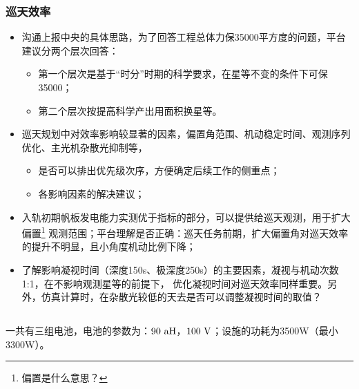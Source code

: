 \subsubsection{巡天效率}
\begin{itemize}
\item[1] 沟通上报中央的具体思路，为了回答工程总体力保35000平方度的问题，平台建议分两个层次回答：
    \begin{itemize}
	\item 第一个层次是基于“时分”时期的科学要求，在星等不变的条件下可保35000；
	\item 第二个层次按提高科学产出用面积换星等。
    \end{itemize}
\item[2] 巡天规划中对效率影响较显著的因素，偏置角范围、机动稳定时间、观测序列优化、主光机杂散光抑制等，
    \begin{itemize}
	\item 是否可以排出优先级次序，方便确定后续工作的侧重点；
	\item 各影响因素的解决建议；
    \end{itemize}
\item[3] 入轨初期帆板发电能力实测优于指标的部分，可以提供给巡天观测，用于扩大偏置\footnote{偏置是什么意思？}
观测范围；平台理解是否正确：巡天任务前期，扩大偏置角对巡天效率的提升不明显，且小角度机动比例下降；
\item[4] 了解影响凝视时间（深度150s、极深度250s）的主要因素，凝视与机动次数1:1，在不影响观测星等的前提下，
优化凝视时间对巡天效率同样重要。另外，仿真计算时，在杂散光较低的天去是否可以调整凝视时间的取值？
\end{itemize}

\subsection{}
一共有三组电池，电池的参数为：$90~\rm{aH}$，$100~\rm{V}$；设施的功耗为3500W（最小3300W）。


